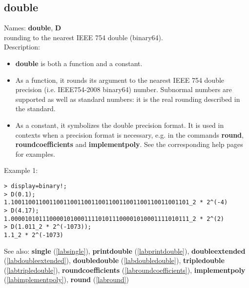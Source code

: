 \subsection{double}
\label{labdouble}
\noindent Names: \textbf{double}, \textbf{D}\\
rounding to the nearest IEEE 754 double (binary64).\\
\noindent Description: \begin{itemize}

\item \textbf{double} is both a function and a constant.

\item As a function, it rounds its argument to the nearest IEEE 754 double precision (i.e. IEEE754-2008 binary64) number.
   Subnormal numbers are supported as well as standard numbers: it is the real
   rounding described in the standard.

\item As a constant, it symbolizes the double precision format. It is used in 
   contexts when a precision format is necessary, e.g. in the commands 
   \textbf{round}, \textbf{roundcoefficients} and \textbf{implementpoly}.
   See the corresponding help pages for examples.
\end{itemize}
\noindent Example 1: 
\begin{center}\begin{minipage}{15cm}\begin{Verbatim}[frame=single]
> display=binary!;
> D(0.1);
1.100110011001100110011001100110011001100110011001101_2 * 2^(-4)
> D(4.17);
1.000010101110000101000111101011100001010001111010111_2 * 2^(2)
> D(1.011_2 * 2^(-1073));
1.1_2 * 2^(-1073)
\end{Verbatim}
\end{minipage}\end{center}
See also: \textbf{single} (\ref{labsingle}), \textbf{printdouble} (\ref{labprintdouble}), \textbf{doubleextended} (\ref{labdoubleextended}), \textbf{doubledouble} (\ref{labdoubledouble}), \textbf{tripledouble} (\ref{labtripledouble}), \textbf{roundcoefficients} (\ref{labroundcoefficients}), \textbf{implementpoly} (\ref{labimplementpoly}), \textbf{round} (\ref{labround})
